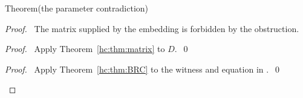 \begin{mergedproofsection}
\begin{namedresult}{Theorem}{(the parameter contradiction)}\label{hc:thm:false}
 \leavevmode\par
\end{namedresult}
\begin{proof}
 \pfsketch\ The matrix supplied by the embedding is forbidden by the obstruction.
 \begin{proof}\pf\ Apply Theorem~\ref{hc:thm:matrix} to $D$.~\qed\end{proof}
 \qedstep
 \begin{proof}\pf\ Apply Theorem~\ref{hc:thm:BRC} to the witness
  and equation in .~\qed\end{proof}
\end{proof}


\end{mergedproofsection}
